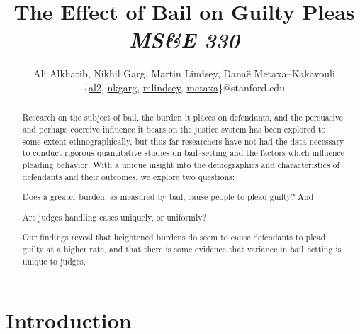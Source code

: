 
\setmainfont[
Ligatures=TeX,
Extension=.otf,
UprightFont= *-regular,
BoldFont=*-bold,
ItalicFont=*-italic,
BoldItalicFont=*-bolditalic]{texgyretermes}



\title{The Effect of Bail on Guilty Pleas\\
\large{\textit{MS\&E 330}}}
\author{
Ali Alkhatib, Nikhil Garg, Martin Lindsey, Danaë Metaxa--Kakavouli
\\
\{\href{mailto:al2@stanford.edu}{al2},
  \href{mailto:nkgarg@stanford.edu}{nkgarg},
  \href{mailto:mlindsey@stanford.edu}{mlindsey},
  \href{mailto:metaxa@stanford.edu}{metaxa}\}@stanford.edu}







\begin{titlingpage}
  \maketitle
\end{titlingpage}

\begin{abstract}
Research on the subject of
bail,
the burden it places on defendants, and
the persuasive and perhaps coercive influence it bears on the justice system
has been explored to some extent ethnographically, but thus far
researchers have not had the data necessary to conduct rigorous quantitative studies on
bail--setting and
the factors which influence pleading behavior. %
With a unique insight into the demographics and characteristics of defendants and their outcomes,
we explore two questions:
\begin{inlinelist}
\item Does a greater burden, as measured by bail, cause people to plead guilty? And
\item Are judges handling cases uniquely, or uniformly?
\end{inlinelist}
Our findings reveal that heightened burdens do seem to cause defendants to plead guilty at a higher rate,
and that there is some evidence that variance in bail--setting is unique to judges.
\end{abstract}



\section{Introduction}


